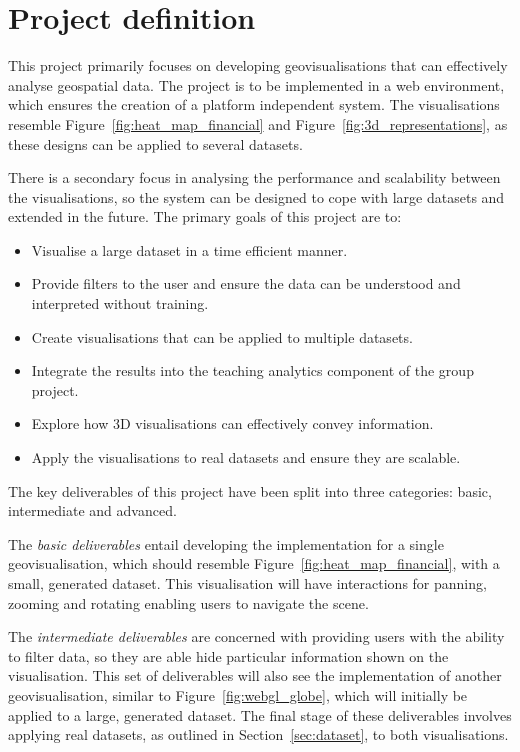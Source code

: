 \section{Project definition} {
\label{sec:project_definition}

	This project primarily focuses on developing geovisualisations that can effectively analyse geospatial data. The project is to be implemented in a web environment, which ensures the creation of a platform independent system. The visualisations resemble Figure~\ref{fig:heat_map_financial} and Figure~\ref{fig:3d_representations}, as these designs can be applied to several datasets.

	

	There is a secondary focus in analysing the performance and scalability between the visualisations, so the system can be designed to cope with large datasets and extended in the future. The primary goals of this project are to:

	\begin{itemize}
		\item Visualise a large dataset in a time efficient manner.
		\item Provide filters to the user and ensure the data can be understood and interpreted without training.
		\item Create visualisations that can be applied to multiple datasets.
		\item Integrate the results into the teaching analytics component of the group project.
		\item Explore how 3D visualisations can effectively convey information.
		\item Apply the visualisations to real datasets and ensure they are scalable.
	\end{itemize}

	The key deliverables of this project have been split into three categories: basic, intermediate and advanced.

	The \emph{basic deliverables} entail developing the implementation for a single geovisualisation, which should resemble Figure~\ref{fig:heat_map_financial}, with a small, generated dataset. This visualisation will have interactions for panning, zooming and rotating enabling users to navigate the scene.

	The \emph{intermediate deliverables} are concerned with providing users with the ability to filter data, so they are able hide particular information shown on the visualisation. This set of deliverables will also see the implementation of another geovisualisation, similar to Figure~\ref{fig:webgl_globe}, which will initially be applied to a large, generated dataset. The final stage of these deliverables involves applying real datasets, as outlined in Section~\ref{sec:dataset}, to both visualisations.

}
